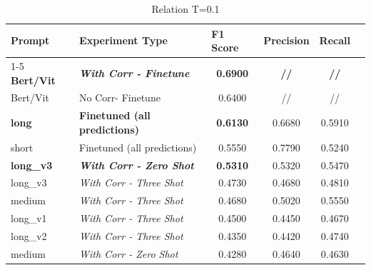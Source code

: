 \documentclass[letterpaper,journal]{IEEEtran}
\begin{document}
\begin{table}[!t]
\centering
\caption{Relation T=0.1}
\label{tab:pixtral_relations_01}
\begin{tabular}{l|l|c|c|cl}
\textbf{Prompt}   & \textbf{Experiment Type}                & \multicolumn{1}{l|}{\textbf{F1 Score}} & \multicolumn{1}{l|}{\textbf{Precision}} & \multicolumn{1}{l}{\textbf{Recall}} &  \\ \cline{1-5}
\textbf{Bert/Vit} & \textit{\textbf{With Corr - Finetune}}  & \textbf{0.6900}                        & \textbf{//}                             & \textbf{//}                         &  \\
Bert/Vit          & No Corr- Finetune                       & 0.6400                                 & //                                      & //                                  &  \\
\textbf{long}     & \textbf{Finetuned (all predictions)}    & \textbf{0.6130}                        & 0.6680                                  & 0.5910                              &  \\
short             & Finetuned (all predictions)             & 0.5550                                 & 0.7790                                  & 0.5240                              &  \\
\textbf{long\_v3} & \textit{\textbf{With Corr - Zero Shot}} & \textbf{0.5310}                        & 0.5320                                  & 0.5470                              &  \\
long\_v3          & \textit{With Corr - Three Shot}         & 0.4730                                 & 0.4680                                  & 0.4810                              &  \\
medium            & \textit{With Corr - Three Shot}         & 0.4680                                 & 0.5020                                  & 0.5550                              &  \\
long\_v1          & \textit{With Corr - Three Shot}         & 0.4500                                 & 0.4450                                  & 0.4670                              &  \\
long\_v2          & \textit{With Corr - Three Shot}         & 0.4350                                 & 0.4420                                  & 0.4740                              &  \\
medium            & \textit{With Corr - Zero Shot}          & 0.4280                                 & 0.4640                                  & 0.4630                              &  \\

\end{tabular}
\end{table}
\end{document}
